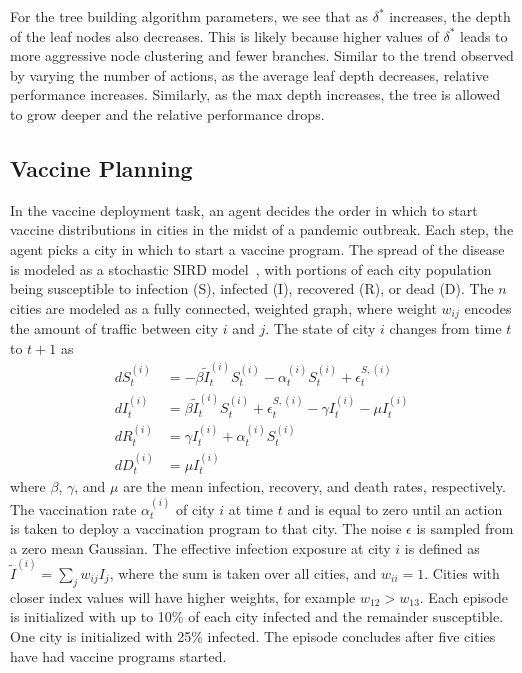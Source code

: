 \documentclass[letterpaper]{article} %
\begin{document}
For the tree building algorithm parameters, we see that as $\delta^*$ increases, the depth of the leaf nodes also decreases.
This is likely because higher values of $\delta^*$ leads to more aggressive node clustering and fewer branches.
Similar to the trend observed by varying the number of actions, as the average leaf depth decreases, relative performance increases.
Similarly, as the max depth increases, the tree is allowed to grow deeper and the relative performance drops.

\subsection{Vaccine Planning}
In the vaccine deployment task, an agent decides the order in which to start vaccine distributions in cities in the midst of a pandemic outbreak.
Each step, the agent picks a city in which to start a vaccine program.
The spread of the disease is modeled as a stochastic SIRD model~\cite{bailey1975}, with portions of each city population being susceptible to infection (S), infected (I), recovered (R), or dead (D).
The $n$ cities are modeled as a fully connected, weighted graph, where weight $w_{ij}$ encodes the amount of traffic between city $i$ and $j$.
The state of city $i$ changes from time $t$ to $t+1$ as
\begin{align}
dS^{(i)}_{t} &= -\beta \tilde{I}^{(i)}_t S^{(i)}_t - \alpha^{(i)}_t S^{(i)}_t +\epsilon^{S, (i)}_t \\
dI^{(i)}_{t} &= \beta \tilde{I}^{(i)}_t S^{(i)}_t +\epsilon^{S, (i)}_t - \gamma I^{(i)}_t - \mu I^{(i)}_t \\
dR^{(i)}_{t} &= \gamma I^{(i)}_t + \alpha^{(i)}_t S^{(i)}_t \\
dD^{(i)}_{t} &= \mu I^{(i)}_t
\end{align}
where $\beta$, $\gamma$, and $\mu$ are the mean infection, recovery, and death rates, respectively.
The vaccination rate $\alpha^{(i)}_{t}$ of city $i$ at time $t$ and is equal to zero until an action is taken to deploy a vaccination program to that city.
The noise $\epsilon$ is sampled from a zero mean Gaussian.
The effective infection exposure at city $i$ is defined as $\tilde{I}^{(i)} = \sum_j w_{ij}I_j$, where the sum is taken over all cities, and $w_{ii} = 1$.
Cities with closer index values will have higher weights, for example $w_{12} > w_{13}$.  Each episode is initialized with up to 10\% of each city infected and the remainder susceptible.
One city is initialized with 25\% infected.
The episode concludes after five cities have had vaccine programs started.
\end{document}
